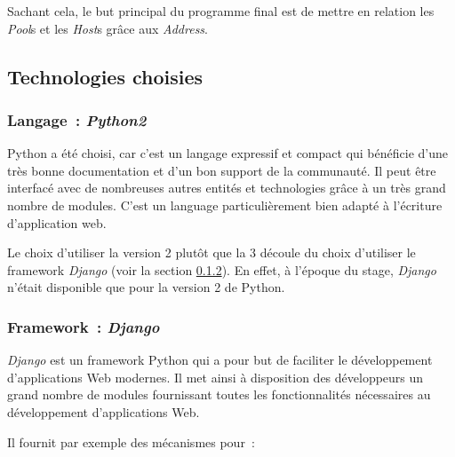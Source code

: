 \documentclass[12pt,a4paper,twoside]{report}
\begin{document}
Sachant cela, le but principal du programme final est de mettre en relation les
\emph{Pool}s et les \emph{Host}s grâce aux \emph{Address}.

\subsection{Technologies choisies}

\subsubsection{Langage~: \emph{Python2}}

Python a été choisi, car c’est un langage expressif et compact qui bénéficie
d’une très bonne documentation et d’un bon support de la communauté. Il peut
être interfacé avec de nombreuses autres entités et technologies grâce à un
très grand nombre de modules. C'est un language particulièrement bien adapté
à l'écriture d'application web.

Le choix d’utiliser la version 2 plutôt que la 3 découle du choix d’utiliser le
framework \emph{Django} (voir la section \ref{sec:framework-django}). En effet,
à l’époque du stage, \emph{Django} n’était disponible que pour la version 2 de
Python.

\subsubsection{Framework~: \emph{Django}}
\label{sec:framework-django}

\emph{Django} est un framework Python qui a pour but de faciliter le
développement d’applications Web modernes. Il met ainsi à disposition des
développeurs un grand nombre de modules fournissant toutes les
fonctionnalités nécessaires au développement d’applications Web.

Il fournit par exemple des mécanismes pour~:
\end{document}
